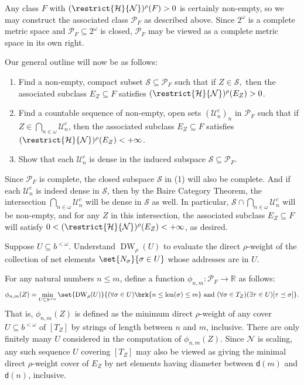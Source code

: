 Any class $F$ with $(\restrict{\mathcal{H}}{\mathcal{N}})^\rho(F) > 0$ is certainly non-empty, so we may construct the associated class $\mathcal{P}_F$ as described above. Since $2^{\omega}$ is a complete metric space and $\mathcal{P}_F \subseteq 2^{\omega}$ is closed, $\mathcal{P}_F$ may be viewed as a complete metric space in its own right.

Our general outline will now be as follows:
\begin{enumerate}[label = (\arabic*)]
    \item Find a non-empty, compact subset $\mathcal{S} \subseteq \mathcal{P}_F$ such that if $Z \in \mathcal{S},$ then the associated subclass $E_Z \subseteq F$ satisfies $(\restrict{\mathcal{H}}{\mathcal{N}})^\rho(E_Z) > 0$.
    \item Find a countable sequence of non-empty, open sets $(\mathcal{U}^c_n)_n$ in $\mathcal{P}_F$ such that if $Z \in \bigcap_{n \in \omega} \mathcal{U}^c_n$, then the associated subclass $E_Z \subseteq F$ satisfies $(\restrict{\mathcal{H}}{\mathcal{N}})^\rho(E_Z) < +\infty$.
    \item Show that each $\mathcal{U}^c_n$ is dense in the induced subspace $\mathcal{S} \subseteq \mathcal{P}_F$.
\end{enumerate}

Since $\mathcal{P}_F$ is complete, the closed subspace $\mathcal{S}$ in (1) will also be complete. And if each $\mathcal{U}^c_n$ is indeed dense in $\mathcal{S}$, then by the Baire Category Theorem, the intersection $\bigcap_{n \in \omega}\mathcal{U}^c_n$ will be dense in $\mathcal{S}$ as well. In particular, $\mathcal{S} \cap \bigcap_{n \in \omega}\mathcal{U}^c_n$ will be non-empty, and for any $Z$ in this intersection, the associated subclass $E_Z \subseteq F$ will satisfy $0 < (\restrict{\mathcal{H}}{\mathcal{N}})^\rho(E_Z) < +\infty$, as desired.

Suppose $U \subseteq b^{<\omega}$. Understand $\operatorname{DW}_\rho(U)$ to evaluate the direct $\rho$-weight of the collection of net elements $\set{N_\sigma}{\sigma \in U}$ whose addresses are in $U$.

For any natural numbers $n \leq m$, define a function $\phi_{n, m}: \mathcal{P}_F \to \mathbb{R}$ as follows:
\begin{align*}
    \phi_{n, m}(Z) = \min_{U \subseteq b^{<\omega}} \set{\operatorname{DW}_\rho(U)}{(\forall \sigma \in U)\brk{n \leq \operatorname{len}(\sigma) \leq m} \text{ and } (\forall \sigma \in T_Z)(\exists \tau \in U)[\tau \preceq \sigma]}.
\end{align*}
That is, $\phi_{n, m}(Z)$ is defined as the minimum direct $\rho$-weight of any cover $U \subseteq b^{<\omega}$ of $[T_Z]$ by strings of length between $n$ and $m$, inclusive. There are only finitely many $U$ considered in the computation of $\phi_{n, m}(Z)$. Since $\mathcal{N}$ is scaling, any such sequence $U$ covering $[T_Z]$ may also be viewed as giving the minimal direct $\rho$-weight cover of $E_Z$ by net elements having diameter between $\mathsf{d}(m)$ and $\mathsf{d}(n)$, inclusive.

